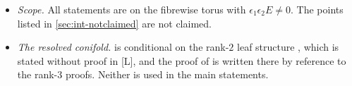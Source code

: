 \begin{itemize}
\item \emph{Scope.} All statements are on the fibrewise torus with $\epsilon_1\epsilon_2E\neq0$. The points listed in \cref{sec:int-notclaimed} are not claimed.
\item \emph{The resolved conifold.}  is conditional on the rank-$2$ leaf structure , which is stated without proof in \textup{[L]}, and the proof of  is written there by reference to the rank-$3$ proofs. Neither is used in the main statements.
\end{itemize}
